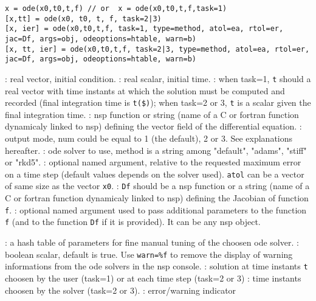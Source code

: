 
\begin{mandesc}
\end{mandesc}

\begin{calling_sequence}
\begin{verbatim}
x = ode(x0,t0,t,f) // or  x = ode(x0,t0,t,f,task=1)
[x,tt] = ode(x0, t0, t, f, task=2|3)
[x, ier] = ode(x0,t0,t,f, task=1, type=method, atol=ea, rtol=er, jac=Df, args=obj, odeoptions=htable, warn=b)
[x, tt, ier] = ode(x0,t0,t,f, task=2|3, type=method, atol=ea, rtol=er, jac=Df, args=obj, odeoptions=htable, warn=b)
\end{verbatim}
\end{calling_sequence}
\begin{parameters}
  \begin{varlist}
    : real vector, initial condition.
    : real scalar, initial time.
    : when task=1, \verb+t+ should a real vector with time instants at which the solution must
    be computed and recorded (final integration time is \verb+t($)+); when task=2 or 3, \verb+t+ is a 
    scalar given the final integration time.
    : nsp function or string (name of a C or fortran function dynamicaly linked to nsp) 
               defining the vector field of the differential equation.
    : output mode, num could be equal to 1 (the default), 2 or 3. See explanations hereafter.
    : ode solver to use, method is a string among  "default", "adams", "stiff" or "rkd5".
    : optional named argument, relative to the requested maximum error on a time step 
    (default values depends on the solver used). \verb+atol+ can be a vector of same size as 
    the vector \verb+x0+.
    : \verb+Df+ should be a nsp function or a string (name of a C or fortran function dynamicaly linked 
                    to nsp) defining the Jacobian of function \verb+f+.
    : optional named argument used to pass additional parameters to the function \verb+f+ 
    (and to the function \verb+Df+ if it is provided). It can be any nsp object.

    : a hash table of parameters for fine manual tuning of the choosen ode solver.
    : boolean scalar, default is true. Use \verb+warn=%f+ to remove the display of warning 
                    informations from the ode solvers in the nsp console.
    : solution at time instants \verb+t+ choosen by the user (task=1) or at each time step (task=2 or 3)
    : time instants choosen by the solver (task=2 or 3).
    : error/warning indicator 
  \end{varlist}
\end{parameters}

